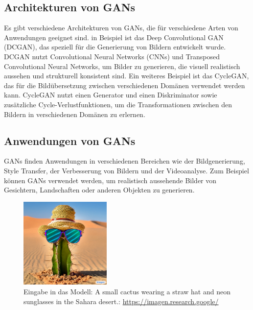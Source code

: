     \subsection{Architekturen von GANs}
    
        Es gibt verschiedene Architekturen von GANs, die für verschiedene Arten von Anwendungen geeignet sind.      
        in Beispiel ist das Deep Convolutional GAN (DCGAN), das speziell für die Generierung von Bildern entwickelt wurde.      %
        DCGAN nutzt Convolutional Neural Networks (CNNs) und Transposed Convolutional Neural Networks, um Bilder zu generieren, die visuell realistisch aussehen und strukturell konsistent sind.
        Ein weiteres Beispiel ist das CycleGAN, das für die Bildübersetzung zwischen verschiedenen Domänen verwendet werden kann.      
        CycleGAN nutzt einen Generator und einen Diskriminator sowie zusätzliche Cycle-Verlustfunktionen, um die Transformationen zwischen den Bildern in verschiedenen Domänen zu erlernen.%
    
    \subsection{Anwendungen von GANs}
    
        GANs finden Anwendungen in verschiedenen Bereichen wie der Bildgenerierung, Style Transfer, der Verbesserung von Bildern und der Videoanalyse.      
        Zum Beispiel können GANs verwendet werden, um realistisch aussehende Bilder von Gesichtern, Landschaften oder anderen Objekten zu generieren.

        \begin{figure}[h]
            \centering
            \includegraphics[width=0.4\textwidth]{img/cactus.jpg}
            \caption{Eingabe in das Modell: A small cactus wearing a straw hat and neon sunglasses in the Sahara desert.: \url{https://imagen.research.google/}}
            \label{fig:GAN_example}
        \end{figure}


